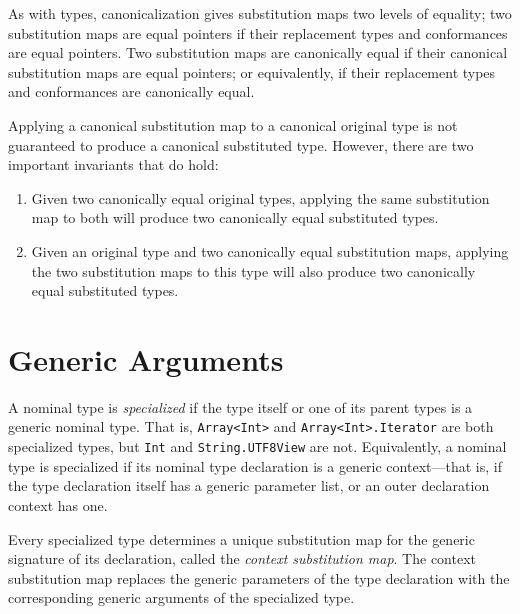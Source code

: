 \documentclass[../generics]{subfiles}
\begin{document}
As with types, canonicalization gives substitution maps two levels of equality; two substitution maps are equal pointers if their replacement types and conformances are equal pointers. Two substitution maps are canonically equal if their canonical substitution maps are equal pointers; or equivalently, if their replacement types and conformances are canonically equal.

Applying a canonical substitution map to a canonical original type is not guaranteed to produce a canonical substituted type. However, there are two important invariants that do hold:
\begin{enumerate}
\item Given two canonically equal original types, applying the same substitution map to both will produce two canonically equal substituted types.
\item Given an original type and two canonically equal substitution maps, applying the two substitution maps to this type will also produce two canonically equal substituted types.
\end{enumerate}

\section{Generic Arguments}\label{contextsubstmap}

A nominal type is \emph{specialized} if the type itself or one of its parent types is a generic nominal type. That is, \texttt{Array<Int>} and \texttt{Array<Int>.Iterator} are both specialized types, but \texttt{Int} and \texttt{String.UTF8View} are not. Equivalently, a nominal type is specialized if its nominal type declaration is a generic context---that is, if the type declaration itself has a generic parameter list, or an outer declaration context has one.

Every specialized type determines a unique substitution map for the generic signature of its declaration, called the \emph{context substitution map}. The context substitution map replaces the generic parameters of the type declaration with the corresponding generic arguments of the specialized type.
\end{document}
